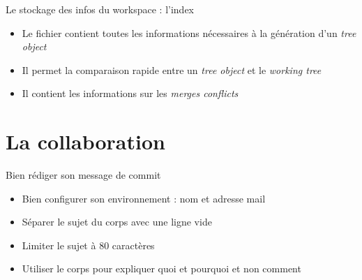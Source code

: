 \documentclass[xcolor=x11names,compress]{beamer}
\begin{document}
\begin{frame}{Le stockage des infos du workspace : l'index}
	\begin{itemize}
		\item Le fichier contient toutes les informations nécessaires à la génération d'un \textit{tree object}
			\vfill
		\item Il permet la comparaison rapide entre un \textit{tree object} et le \textit{working tree}
			\vfill
		\item Il contient les informations sur les \textit{merges conflicts}
	\end{itemize}
\end{frame}

\section{La collaboration}
\begin{frame}{Bien rédiger son message de commit}
	\begin{itemize}
		\item<1-> Bien configurer son environnement : nom et adresse mail
			\vfill
		\item<2-> Séparer le sujet du corps avec une ligne vide
			\vfill
		\item<3-> Limiter le sujet à 80 caractères
			\vfill
		\item<4-> Utiliser le corps pour expliquer quoi et pourquoi et non comment 
	\end{itemize}
\end{frame}
\end{document}
